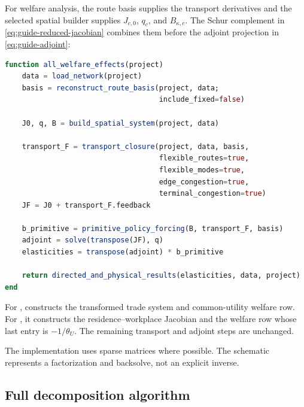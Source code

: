For welfare analysis, the route basis supplies the transport derivatives and
the selected spatial builder supplies \(J_{c,0}\), \(q_c\), and
\(B_{\kappa,c}\). The Schur complement in
\eqref{eq:guide-reduced-jacobian} combines them before the adjoint projection
in \eqref{eq:guide-adjoint}:
\begin{lstlisting}[language=Julia]
function all_welfare_effects(project)
    data = load_network(project)
    basis = reconstruct_route_basis(project, data;
                                    include_fixed=false)

    J0, q, B = build_spatial_system(project, data)

    transport_F = transport_closure(project, data, basis,
                                    flexible_routes=true,
                                    flexible_modes=true,
                                    edge_congestion=true,
                                    terminal_congestion=true)
    JF = J0 + transport_F.feedback

    b_primitive = primitive_policy_forcing(B, transport_F, basis)
    adjoint = solve(transpose(JF), q)
    elasticities = transpose(adjoint) * b_primitive

    return directed_and_physical_results(elasticities, data, project)
end
\end{lstlisting}

For ,  constructs the
transformed trade system and common-utility welfare row. For
, it constructs the residence--workplace Jacobian and
the welfare row whose last entry is \(-1/\theta_U\). The remaining transport
and adjoint steps are unchanged.

The implementation uses sparse matrices where possible. The schematic
 represents a factorization and backsolve, not an explicit inverse.

\subsection{Full decomposition algorithm}

